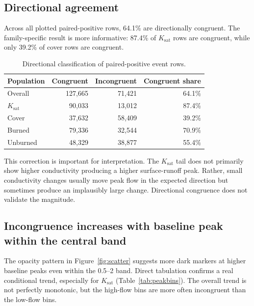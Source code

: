 \documentclass[11pt]{article}
\newcommand{\Ksat}{\ensuremath{K_{\mathrm{sat}}}}
\begin{document}
\subsection{Directional agreement}

Across all plotted paired-positive rows, 64.1\% are directionally congruent.
The family-specific result is more informative: 87.4\% of \Ksat{} rows are
congruent, while only 39.2\% of cover rows are congruent.

\begin{table}[H]
  \centering
  \caption{Directional classification of paired-positive event rows.}
  \label{tab:direction}
  \begin{tabular}{lrrr}
    \toprule
    Population & Congruent & Incongruent & Congruent share \\
    \midrule
    Overall & 127,665 & 71,421 & 64.1\% \\
    \Ksat{} & 90,033 & 13,012 & 87.4\% \\
    Cover & 37,632 & 58,409 & 39.2\% \\
    Burned & 79,336 & 32,544 & 70.9\% \\
    Unburned & 48,329 & 38,877 & 55.4\% \\
    \bottomrule
  \end{tabular}
\end{table}

This correction is important for interpretation. The \Ksat{} tail does not
primarily show higher conductivity producing a higher surface-runoff peak.
Rather, small conductivity changes usually move peak flow in the expected
direction but sometimes produce an implausibly large change. Directional
congruence does not validate the magnitude.

\subsection{Incongruence increases with baseline peak within the central band}

The opacity pattern in Figure~\ref{fig:scatter} suggests more dark markers at
higher baseline peaks even within the 0.5--2 band. Direct tabulation confirms a
real conditional trend, especially for \Ksat{} (Table~\ref{tab:peakbins}). The
overall trend is not perfectly monotonic, but the high-flow bins are more often
incongruent than the low-flow bins.
\end{document}
